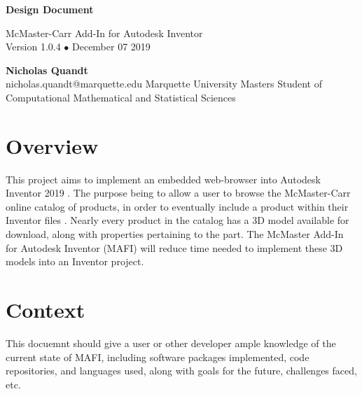 \documentclass[12pt, letterpaper]{article}
\begin{document}
\begin{titlepage}
   \begin{flushright}
       \vspace*{5cm}
 
       {\Huge \textbf{Design Document}}
 
       \vspace{0.5cm}
        McMaster-Carr Add-In for Autodesk Inventor\\
        Version 1.0.4 $\bullet$ December 07 2019
 
       \vspace{1.5cm}
 
       \textbf{Nicholas Quandt}
       \\
       nicholas.quandt@marquette.edu
       \vfill
       Marquette University Masters Student of\\
       Computational Mathematical and Statistical Sciences\\
       \vspace{1cm}
 
   \end{flushright}
\end{titlepage}

\section{Overview}
This project aims to implement an embedded web-browser into Autodesk Inventor 2019 \cite{Inventor}. The purpose being 
to allow a user to browse the McMaster-Carr online catalog of products, in order to eventually
include a product within their Inventor files \cite{McMaster}. Nearly every product in the catalog has a 3D model
available for download, along with properties pertaining to the part. The McMaster Add-In for Autodesk Inventor (MAFI)
will reduce time needed to implement these 3D models into an Inventor project.
\section{Context}
This docuemnt should give a user or other developer ample knowledge of the current state of MAFI, including
software packages implemented, code repositories, and languages used, along with goals for the future, challenges faced, etc.
\end{document}
